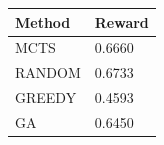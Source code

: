 \begin{tabular}{ll}
\hline
Method & Reward \\
\hline
  MCTS & 0.6660 \\
  RANDOM & 0.6733 \\
  GREEDY & 0.4593 \\
  GA & 0.6450 \\
\hline
\end{tabular}
